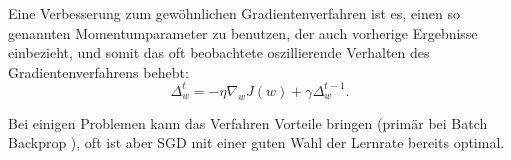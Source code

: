 Eine Verbesserung zum gewöhnlichen Gradientenverfahren ist es, einen so genannten Momentumparameter zu benutzen, der auch vorherige Ergebnisse einbezieht, und somit das oft beobachtete oszillierende Verhalten des Gradientenverfahrens behebt:
\begin{equation}
 \Delta_w^t = - \eta  \nabla_w J(w) + \gamma \Delta_w^{t-1}.
\end{equation}

Bei einigen Problemen kann das Verfahren Vorteile bringen (primär bei Batch Backprop \cite{lecunefficient}), oft ist aber SGD mit einer guten Wahl der Lernrate bereits optimal\cite{bengio2012practical}.
